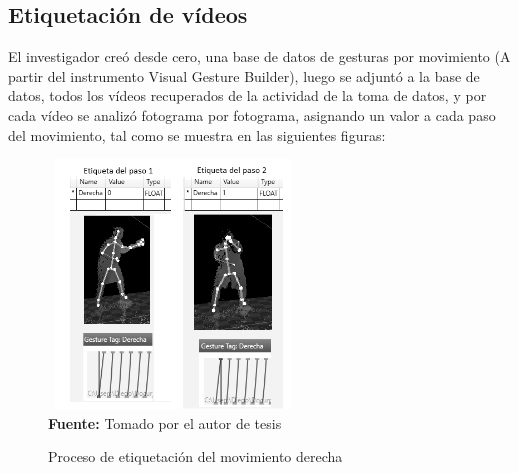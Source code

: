 \subsection{Etiquetaci\'on de v\'ideos}
El investigador cre\'o desde cero, una base de datos de gesturas por movimiento (A partir del instrumento Visual Gesture Builder), luego se adjunt\'o a la base de datos, todos los v\'ideos recuperados de la actividad de la toma de datos, y por cada v\'ideo se analiz\'o fotograma por fotograma, asignando un valor a cada paso del movimiento, tal como se muestra en las siguientes figuras:
 \begin{figure}[H]
	\caption{Proceso de etiquetaci\'on del movimiento derecha}
	\label{fig:getTag}
	\centering
	\includegraphics[width=250px,height=250px]{graphics/etiquetas.png} \\
	\textbf{Fuente:} Tomado por el autor de tesis
\end{figure} 
